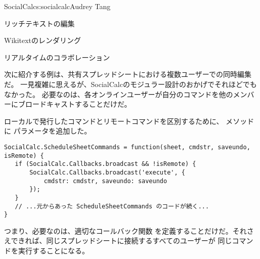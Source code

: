 \begin{aosachapter}{SocialCalc}{s:socialcalc}{Audrey Tang}
\begin{aosasect1}{リッチテキストの編集}
\begin{aosasect2}{Wikitextのレンダリング}

\end{aosasect2}

\end{aosasect1}


\begin{aosasect1}{リアルタイムのコラボレーション}

次に紹介する例は、共有スプレッドシートにおける複数ユーザーでの同時編集だ。
一見複雑に思えるが、SocialCalcのモジュラー設計のおかげでそれほどでもなかった。
必要なのは、各オンラインユーザーが自分のコマンドを他のメンバーにブロードキャストすることだけだ。

ローカルで発行したコマンドとリモートコマンドを区別するために、
メソッドに
パラメータを追加した。

\begin{verbatim}
SocialCalc.ScheduleSheetCommands = function(sheet, cmdstr, saveundo, isRemote) {
   if (SocialCalc.Callbacks.broadcast && !isRemote) {
       SocialCalc.Callbacks.broadcast('execute', {
           cmdstr: cmdstr, saveundo: saveundo
       });
   }
   // ...元からあった ScheduleSheetCommands のコードが続く...
}
\end{verbatim}

\noindent
つまり、必要なのは、適切なコールバック関数
を定義することだけだ。それさえできれば、同じスプレッドシートに接続するすべてのユーザーが
同じコマンドを実行することになる。


\end{aosasect1}
\end{aosachapter}
